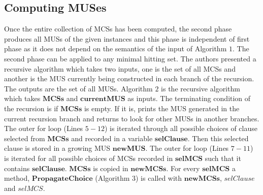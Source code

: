 \subsection{Computing MUSes}
Once the entire collection of MCSs has been computed, the second phase produces all MUSs of the given instances and this phase is independent of first phase as it does not depend on the semantics of the input of Algorithm $1$. The second phase can be applied to any minimal hitting set. The authors presented a recursive algorithm which takes two inputs, one is the set of all MCSs and another is the MUS currently being constructed in each branch of the recursion. The outputs are the set of all MUSs.\newline
Algorithm $2$ is the recursive algorithm which takes $\mathbf{MCSs}$ and $\mathbf{currentMUS}$ as inputs. The terminating condition of the recursion is if $\mathbf{MCSs}$ is empty. If it is, prints the MUS generated in the current recursion branch and returns to look for other MUSs in another branches. The outer for loop (Lines $5-12$) is iterated through all possible choices of clause selected from $\mathbf{MCSs}$ and recorded in a variable $\mathbf{selClause}$. Then this selected clause is stored in a growing MUS $\mathbf{newMUS}$. The outer for loop (Lines $7-11$) is iterated for all possible choices of MCSs recorded in $\mathbf{selMCS}$ such that it contains $\mathbf{selClause}$. $\mathbf{MCSs}$ is copied in $\mathbf{newMCSs}$.\newline
For every $\mathbf{selMCS}$ a method, $\mathbf{PropagateChoice}$ (Algorithm $3$) is called with $\mathbf{newMCSs}$, $\mathbf{\textit{selClause}}$ and $\mathbf{\textit{selMCS}}$.

